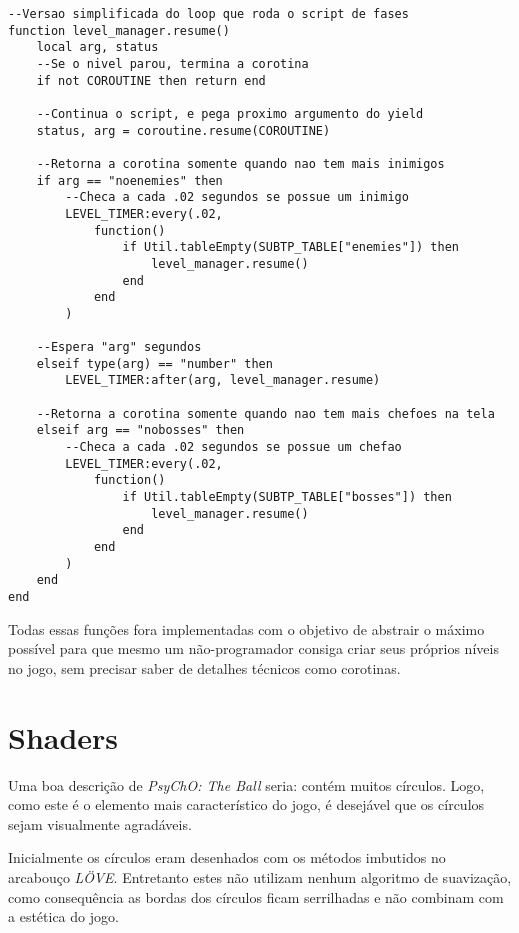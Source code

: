 \begin{lstlisting}[language={[5.0]lua}]
--Versao simplificada do loop que roda o script de fases
function level_manager.resume()
    local arg, status
    --Se o nivel parou, termina a corotina
    if not COROUTINE then return end

    --Continua o script, e pega proximo argumento do yield
    status, arg = coroutine.resume(COROUTINE)

    --Retorna a corotina somente quando nao tem mais inimigos
    if arg == "noenemies" then
        --Checa a cada .02 segundos se possue um inimigo
        LEVEL_TIMER:every(.02,
            function()
                if Util.tableEmpty(SUBTP_TABLE["enemies"]) then
                    level_manager.resume()
                end
            end
        )

    --Espera "arg" segundos
    elseif type(arg) == "number" then
        LEVEL_TIMER:after(arg, level_manager.resume)

    --Retorna a corotina somente quando nao tem mais chefoes na tela
    elseif arg == "nobosses" then
        --Checa a cada .02 segundos se possue um chefao
        LEVEL_TIMER:every(.02,
            function()
                if Util.tableEmpty(SUBTP_TABLE["bosses"]) then
                    level_manager.resume()
                end
            end
        )
    end
end
\end{lstlisting}

Todas essas funções fora implementadas com o objetivo de abstrair o máximo possível para que mesmo um não-programador consiga criar seus próprios níveis no jogo, sem precisar saber de detalhes técnicos como corotinas.

\section{Shaders}
\label{sec:shaders}

Uma boa descrição de \textit{PsyChO: The Ball} seria: contém muitos círculos. Logo, como este é o elemento mais característico do jogo, é desejável que os círculos sejam visualmente agradáveis.

Inicialmente os círculos eram desenhados com os métodos imbutidos no arcabouço \textit{LÖVE}. Entretanto estes não utilizam nenhum algoritmo de suavização, como consequência as bordas dos círculos ficam serrilhadas e não combinam com a estética do jogo.

